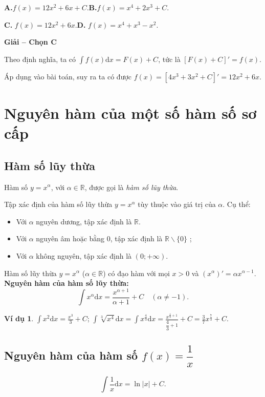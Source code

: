 \documentclass[12pt,a4paper,oneside]{book}
\theoremstyle{theorem}
\theoremstyle{definition}
\newtheorem{vd}[theorem2]{Ví dụ}
\begin{document}
\noindent \textbf{A.}$f(x) = 12x^2 + 6x + C$.\hfill \textbf{B.}$f(x) = x^4 + 2x^3 + C$.

\noindent \textbf{C.} $f(x) = 12x^2 + 6x$.\hfill \textbf{D.} $f(x) = x^4 + x^3-x^2$.

\noindent \hspace*{3cm} 
\textbf{Giải -- Chọn C}

\noindent Theo định nghĩa, ta có $\int f(x)\mathrm{d}x = F(x) + C$, tức là $[F(x) + C]' = f(x)$.

\noindent Áp dụng vào bài toán, suy ra ta có được $f(x) = [4x^3 + 3x^2 + C]' = 12x^2 + 6x$.
\section{Nguyên hàm của một số hàm số sơ cấp}
\subsection{Hàm số lũy thừa}
Hàm số $y = x^{\alpha}$, với $\alpha \in \mathbb{R}$, được gọi là \textit{hàm số lũy thừa}.

Tập xác định của hàm số lũy thừa $y = x^{\alpha}$ tùy thuộc vào giá trị của $\alpha$. Cụ thể:
\begin{itemize}
    \item[\textbf{--}] Với $\alpha$ nguyên dương, tập xác định là $\mathbb{R}$.
    \item[\textbf{--}] Với $\alpha$ nguyên âm hoặc bằng $0$, tập xác định là $\mathbb{R}\backslash\{0\}$ ;
    \item[\textbf{--}] Với $\alpha$ không nguyên, tập xác định là $(0; +\infty)$.
\end{itemize}
Hàm số lũy thừa $y = x^{\alpha}$ ($\alpha \in \mathbb{R}$) có đạo hàm với mọi $x > 0$ và $(x^{\alpha})' = \alpha x^{\alpha-1}$.
\textbf{Nguyên hàm của hàm số lũy thừa:}
\[
\int x^{\alpha}\mathrm{d}x = \frac{x^{\alpha+1}}{\alpha + 1} + C \quad (\alpha \neq -1).
\]
\begin{vd}
    $\displaystyle\int x^2\mathrm{d}x = \frac{x^3}{3} + C$; \quad $\displaystyle\int \sqrt[3]{x^4}\mathrm{d}x = \int x^{\frac{4}{3}}\mathrm{d}x = \frac{x^{\frac{4}{3}+1}}{\dfrac{4}{3} + 1} + C = \frac{3}{7}x^{\frac{7}{3}} + C$.
\end{vd} 
\subsection{Nguyên hàm của hàm số $f(x) = \dfrac{1}{x}$} 
\[
\int \frac{1}{x}\mathrm{d}x = \ln|x| + C.
\]
\end{document}
